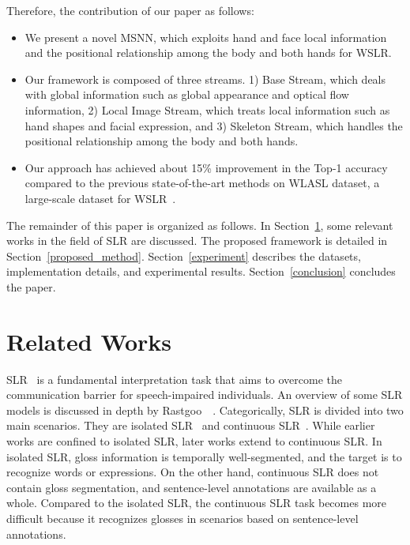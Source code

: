 \documentclass[journal]{IEEEtran}
\begin{document}
Therefore, the contribution of our paper as follows:
\begin{itemize}
\item We present a novel MSNN, which exploits hand and face local information and the positional relationship among the body and both hands for WSLR.

\item Our framework is composed of three streams. 1) Base Stream, which deals with global information such as global appearance and optical flow information, 
2) Local Image Stream, which treats local information such as hand shapes and facial expression, and 3) Skeleton Stream, which handles the positional relationship among the body and both hands. 

\item Our approach has achieved about 15\% improvement in the Top-1 accuracy compared to the previous state-of-the-art methods on WLASL dataset, a large-scale dataset for WSLR~\cite{li2020word}.

\end{itemize}

The remainder of this paper is organized as follows. In Section~\ref{related}, some relevant works in the field of SLR are discussed. The proposed framework is detailed in Section~\ref{proposed_method}. Section~\ref{experiment} describes the datasets, implementation details, and experimental results. Section~\ref{conclusion} concludes the paper.





























\section{Related Works} \label{related}
SLR~\cite{li2020transferring, wang2014similarity, cui2019deep, evangelidis2014continuous, koller2015continuous} is a fundamental interpretation task that aims to overcome the communication barrier for speech-impaired individuals. An overview of some SLR models is discussed in depth by Rastgoo~\etal~\cite{rastgoo2020sign}. Categorically, SLR is divided into two main scenarios. They are isolated SLR~\cite{li2020transferring, wang2014similarity} and continuous SLR~\cite{cui2019deep, evangelidis2014continuous, koller2015continuous}. While earlier works are confined to isolated SLR, later works extend to continuous SLR. In isolated SLR, gloss information is temporally well-segmented, and the target is to recognize words or expressions. On the other hand, continuous SLR does not contain gloss segmentation, and sentence-level annotations are available as a whole. Compared to the isolated SLR, the continuous SLR task becomes more difficult because it recognizes glosses in scenarios based on sentence-level annotations.
\end{document}
